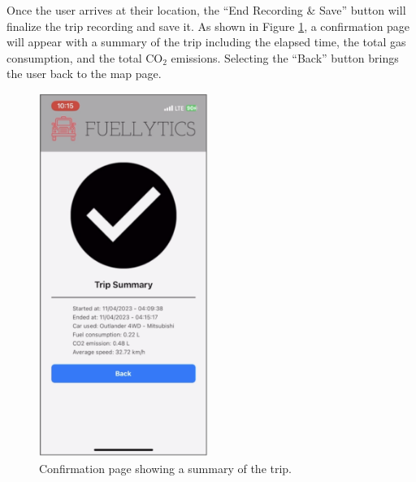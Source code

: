 \documentclass[11pt, oneside]{article}
\begin{document}
Once the user arrives at their location, the ``End Recording \& Save'' button will finalize the trip recording and save it.  As shown in Figure \ref{fig:confirmation}, a confirmation page will appear with a summary of the trip including the elapsed time, the total gas consumption, and the total CO$_2$ emissions. Selecting the ``Back'' button brings the user back to the map page.
\begin{figure}[H]
\centerline{\includegraphics[width=5.5cm]{img/confirmation.png}}
\caption{\label{fig:confirmation}Confirmation page showing a summary of the trip.}
\end{figure}
\end{document}
